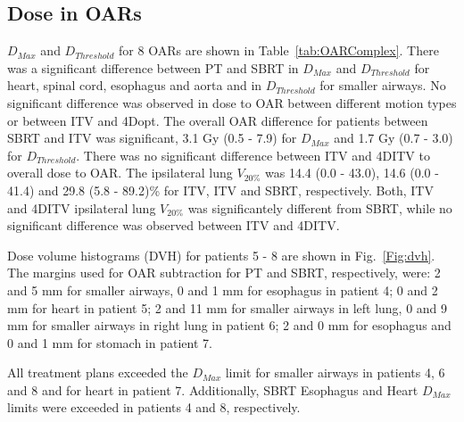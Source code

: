 \documentclass[type=dr, dr=rernat, accentcolor=tud7b,colorbacktitle, bigchapter, openright, twoside, 12pt ]{tudthesis}
\begin{document}
\subsection{Dose in OARs}

$D_{Max}$ and $D_{Threshold}$ for 8 OARs are shown in Table~\ref{tab:OARComplex}. There was a significant difference between PT and SBRT in $D_{Max}$ and $D_{Threshold}$ 
for heart, spinal cord, esophagus and aorta and in $D_{Threshold}$ for smaller airways.
No significant difference was observed in dose to OAR between different motion types or between ITV and 4Dopt.
The overall OAR difference for patients between SBRT and ITV
was significant, 3.1 Gy (0.5 - 7.9)  for $D_{Max}$ and 1.7 Gy (0.7 - 3.0) for $D_{Threshold}$. There was no significant difference between ITV and 4DITV to overall dose to OAR.
The ipsilateral lung $V_{20\%}$ was 14.4 (0.0 - 43.0), 14.6 (0.0 - 41.4) and 29.8 (5.8 - 89.2)\% for ITV, ITV and SBRT, respectively. Both, ITV and 4DITV ipsilateral lung $V_{20\%}$ was
significantely different from SBRT, while no significant difference was observed between ITV and 4DITV.

Dose volume histograms (DVH) for patients 5 - 8 are shown in Fig.~\ref{Fig:dvh}. The margins used for OAR subtraction for PT and SBRT, respectively, were:
2 and 5 mm for smaller airways, 0 and 1 mm for esophagus in patient 4; 
0 and 2 mm for heart in patient 5; 
2 and 11 mm for smaller airways in left lung, 0 and 9 mm for smaller airways in right lung in patient 6;
2 and 0 mm for esophagus and 0 and 1 mm for stomach in patient 7.

All treatment plans exceeded the $D_{Max}$ limit for smaller airways in patients 4, 6 and 8 and for heart in patient 7. 
Additionally, SBRT Esophagus and Heart $D_{Max}$ limits were exceeded in patients 4 and 8, respectively.
\end{document}
